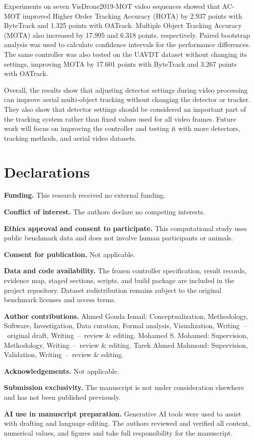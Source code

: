 \documentclass[pdflatex,sn-mathphys-num,iicol]{sn-jnl}
\begin{document}
Experiments on seven VisDrone2019-MOT video sequences showed that AC-MOT
improved Higher Order Tracking Accuracy (HOTA) by 2.937 points with ByteTrack
and 1.325 points with OATrack. Multiple Object Tracking Accuracy (MOTA) also
increased by 17.995 and 6.318 points, respectively. Paired bootstrap analysis
was used to calculate confidence intervals for the performance differences.
The same controller was also tested on the UAVDT dataset without changing its
settings, improving MOTA by 17.601 points with ByteTrack and 3.267 points with
OATrack.

Overall, the results show that adjusting detector settings during video
processing can improve aerial multi-object tracking without changing the
detector or tracker. They also show that detector settings should be
considered an important part of the tracking system rather than fixed values
used for all video frames. Future work will focus on improving the controller
and testing it with more detectors, tracking methods, and aerial video
datasets.

\backmatter

\section*{Declarations}

\noindent\textbf{Funding.} This research received no external funding.

\noindent\textbf{Conflict of interest.} The authors declare no competing interests.

\noindent\textbf{Ethics approval and consent to participate.} This computational study uses public benchmark data and does not involve human participants or animals.

\noindent\textbf{Consent for publication.} Not applicable.

\noindent\textbf{Data and code availability.} The frozen controller specification, result records, evidence map, staged sections, scripts, and build package are included in the project repository. Dataset redistribution remains subject to the original benchmark licenses and access terms.

\noindent\textbf{Author contributions.} Ahmed Gouda Ismail: Conceptualization, Methodology, Software, Investigation, Data curation, Formal analysis, Visualization, Writing~--~original draft, Writing~--~review \& editing. Mohamed S. Mohamed: Supervision, Methodology, Writing~--~review \& editing. Tarek Ahmed Mahmoud: Supervision, Validation, Writing~--~review \& editing.

\noindent\textbf{Acknowledgements.} Not applicable.

\noindent\textbf{Submission exclusivity.} The manuscript is not under consideration elsewhere and has not been published previously.

\noindent\textbf{AI use in manuscript preparation.} Generative AI tools were used to assist with drafting and language editing. The authors reviewed and verified all content, numerical values, and figures and take full responsibility for the manuscript.


\end{document}
